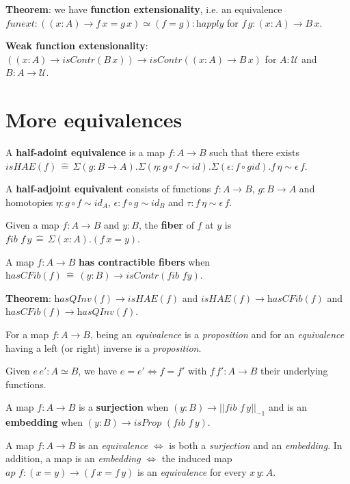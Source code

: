 \documentclass[a4paper]{article}
\begin{document}
\textbf{Theorem}: we have \textbf{function extensionality}, i.e. an equivalence $\textit{funext} : ((x : A) \to f \, x = g \, x) \simeq (f = g) : \textit{happly}$ for $f \, g : (x : A) \to B \, x$.

\textbf{Weak function extensionality}: $((x : A) \to \textit{isContr}(B \, x)) \to \textit{isContr}((x : A) \to B \, x)$ for $A : \mathcal{U}$ and $B : A \to \mathcal{U}$.

\section*{More equivalences}

A \textbf{half-adoint equivalence} is a map $f : A \to B$ such that there exists $\textit{isHAE}(f) \, \hat{=} \, \Sigma(g : B \to A).\Sigma(\eta : g \circ f \sim \textit{id}).\Sigma(\epsilon : f \circ g \textit{id}). f \, \eta \sim \epsilon \, f$.

A \textbf{half-adjoint equivalent} consists of functions $f : A \to B$, $g : B \to A$ and homotopies $\eta : g \circ f \sim \textit{id}_A$, $\epsilon : f \circ g \sim \textit{id}_B$ and $\tau : f \, \eta \sim \epsilon \, f$.

Given a map $f : A \to B$ and $y : B$, the \textbf{fiber} of $f$ at $y$ is $\textit{fib } f \, y \, \hat{=} \, \Sigma(x : A).(f \, x = y)$.

A map $f : A \to B$ \textbf{has contractible fibers} when $\textit{hasCFib}(f) \, \hat{=} \, (y : B) \to \textit{isContr}(\textit{fib } f y)$.

\textbf{Theorem}: $\textit{hasQInv}(f) \to \textit{isHAE}(f)$ and $\textit{isHAE}(f) \to \textit{hasCFib}(f)$ and $\textit{hasCFib}(f) \to \textit{hasQInv}(f)$.

For a map $f : A \to B$, being an \textit{equivalence} is a \textit{proposition} and for an \textit{equivalence} having a left (or right) inverse is a \textit{proposition}.

Given $e \, e' : A \simeq B$, we have $e = e' \iff f = f'$ with $f \, f' : A \to B$ their underlying functions.

A map $f : A \to B$ is a \textbf{surjection} when $(y : B) \to || \textit{fib } f \, y ||_{-1}$ and is an \textbf{embedding} when $(y : B) \to \textit{isProp }(\textit{fib } f \, y)$.

A map $f : A \to B$ is an \textit{equivalence} $\iff$ is both a \textit{surjection} and an \textit{embedding}. In addition, a map is an \textit{embedding} $\iff$ the induced map $\textit{ap } f : (x = y) \to (f \, x = f \, y)$ is an \textit{equivalence} for every $x \, y : A$.
\end{document}
